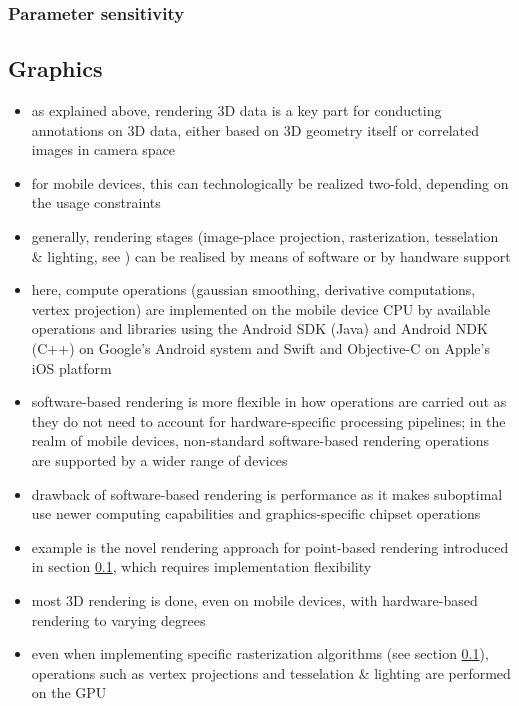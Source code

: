 \documentclass[review]{elsarticle}
\begin{document}
\subsubsection{Parameter sensitivity}

\subsection{Graphics}

\begin{itemize}
\item as explained above, rendering 3D data is a key part for conducting annotations on 3D data, either based on 3D geometry itself or correlated images in camera space
\item for mobile devices, this can technologically be realized two-fold, depending on the usage constraints
\item generally, rendering stages (image-place projection, rasterization, tesselation \& lighting, see \cite{Kessenich2016}) can be realised by means of software or by handware support
\item here, compute operations (gaussian smoothing, derivative computations, vertex projection) are implemented on the mobile device CPU by available operations and libraries using the Android SDK (Java) and Android NDK (C++) on Google's Android system and Swift and Objective-C on Apple's iOS platform
\item software-based rendering is more flexible in how operations are carried out as they do not need to account for hardware-specific processing pipelines; in the realm of mobile devices, non-standard software-based rendering operations are supported by a wider range of devices
\item drawback of software-based rendering is performance as it makes suboptimal use newer computing capabilities and graphics-specific chipset operations
\item example is the novel rendering approach for point-based rendering introduced in section \ref{}, which requires implementation flexibility
\item most 3D rendering is done, even on mobile devices, with hardware-based rendering to varying degrees
\item even when implementing specific rasterization algorithms (see section \ref{}), operations such as vertex projections and tesselation \& lighting are performed on the GPU

\end{itemize}
\end{document}
